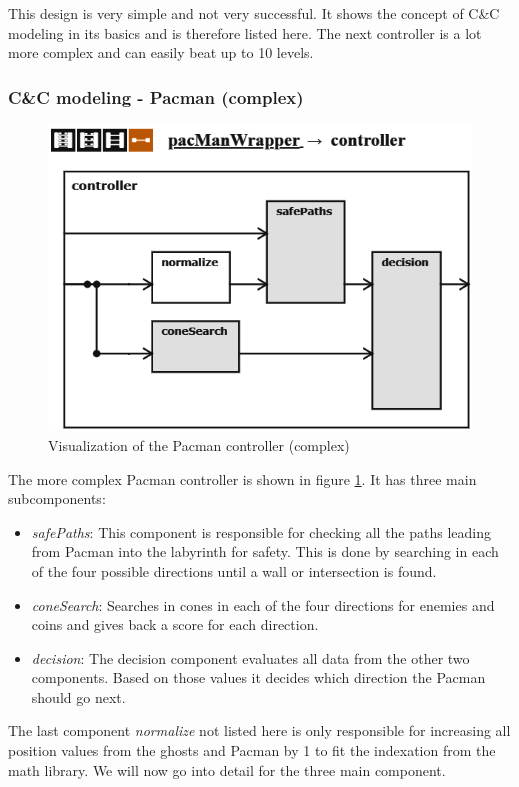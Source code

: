 This design is very simple and not very successful. It shows the concept of C\&C modeling in its basics and is therefore listed here. The next controller is a lot more complex and can easily beat up to 10 levels.

\subsubsection{C\&C modeling - Pacman (complex)}
\begin{figure}
	\caption{Visualization of the Pacman controller (complex)}
	\label{fig:visPacman20}
	\centering
	\includegraphics[scale=0.85]{pictures/Pacman/Controller20.png}
\end{figure}

The more complex Pacman controller is shown in figure \ref{fig:visPacman20}.
It has three main subcomponents:
\begin{itemize}
	\item \textit{safePaths}: This component is responsible for checking all the paths leading from Pacman into the labyrinth for safety. This is done by searching in each of the four possible directions until a wall or intersection is found.	
	\item \textit{coneSearch}: Searches in cones in each of the four directions for enemies and coins and gives back a score for each direction.	
	\item \textit{decision}: The decision component evaluates all data from the other two components. Based on those values it decides which direction the Pacman should go next.	
\end{itemize}
The last component \textit{normalize} not listed here is only responsible for increasing all position values from the ghosts and Pacman by 1 to fit the indexation from the math library.
We will now go into detail for the three main component.
\newline

